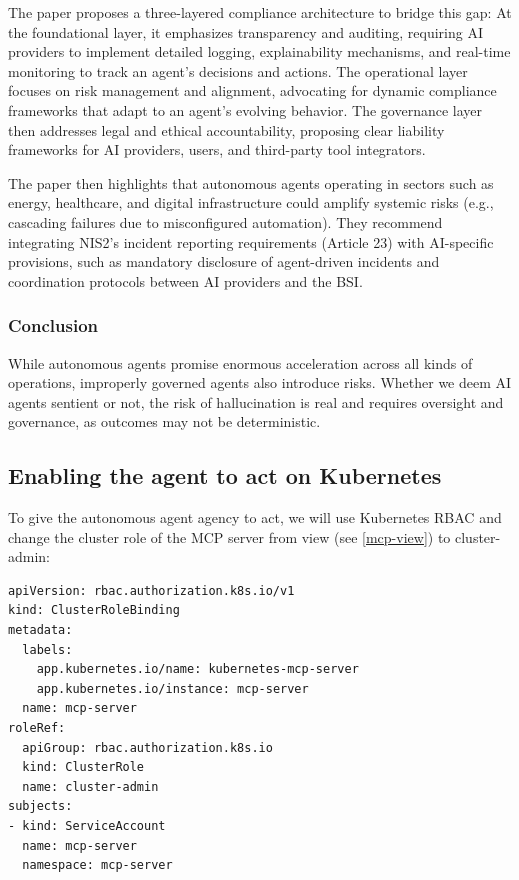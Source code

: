 The paper proposes a three-layered compliance architecture to bridge this gap: At the foundational layer, it emphasizes transparency and auditing, requiring AI providers to implement detailed logging, explainability mechanisms, and real-time monitoring to track an agent's decisions and actions. The operational layer focuses on risk management and alignment, advocating for dynamic compliance frameworks that adapt to an agent's evolving behavior. The governance layer then addresses legal and ethical accountability, proposing clear liability frameworks for AI providers, users, and third-party tool integrators.

The paper then highlights that autonomous agents operating in sectors such as energy, healthcare, and digital infrastructure could amplify systemic risks (e.g., cascading failures due to misconfigured automation). They recommend integrating NIS2's incident reporting requirements (Article 23) with AI-specific provisions, such as mandatory disclosure of agent-driven incidents and coordination protocols between AI providers and the BSI.

\subsubsection{Conclusion}

While autonomous agents promise enormous acceleration across all kinds of operations, improperly governed agents also introduce risks. Whether we deem AI agents sentient or not, the risk of hallucination is real and requires oversight and governance, as outcomes may not be deterministic.

\subsection{Enabling the agent to act on Kubernetes}

To give the autonomous agent agency to act, we will use Kubernetes RBAC and change the cluster role of the MCP server from view (see \ref{mcp-view}) to cluster-admin:

\begin{lstlisting}[caption=Cluster Admin Role Definition, frame=single, basicstyle=\ttfamily\small, breaklines=true]
apiVersion: rbac.authorization.k8s.io/v1
kind: ClusterRoleBinding
metadata:
  labels:
    app.kubernetes.io/name: kubernetes-mcp-server
    app.kubernetes.io/instance: mcp-server
  name: mcp-server
roleRef:
  apiGroup: rbac.authorization.k8s.io
  kind: ClusterRole
  name: cluster-admin
subjects:
- kind: ServiceAccount
  name: mcp-server
  namespace: mcp-server
  
\end{lstlisting}

